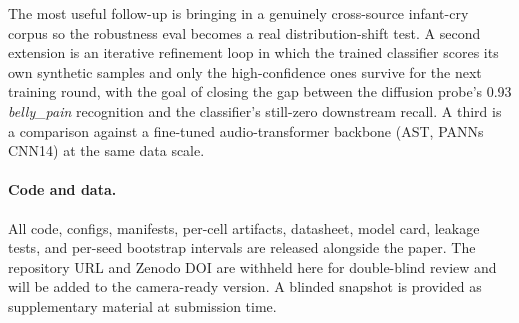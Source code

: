 \documentclass[10pt]{article}
\begin{document}
The most useful follow-up is bringing in a genuinely cross-source infant-cry corpus so the robustness eval becomes a real distribution-shift test. A second extension is an iterative refinement loop in which the trained classifier scores its own synthetic samples and only the high-confidence ones survive for the next training round, with the goal of closing the gap between the diffusion probe's 0.93 \textit{belly\_pain} recognition and the classifier's still-zero downstream recall. A third is a comparison against a fine-tuned audio-transformer backbone (AST, PANNs CNN14) at the same data scale.

\paragraph{Code and data.} All code, configs, manifests, per-cell artifacts, datasheet, model card, leakage tests, and per-seed bootstrap intervals are released alongside the paper. The repository URL and Zenodo DOI are withheld here for double-blind review and will be added to the camera-ready version. A blinded snapshot is provided as supplementary material at submission time.



\end{document}
